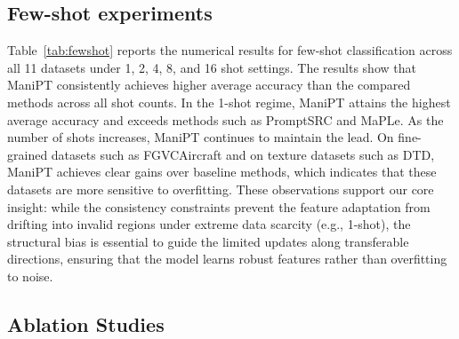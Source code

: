 \documentclass{article}
\theoremstyle{plain}
\theoremstyle{definition}
\theoremstyle{remark}
\begin{document}
	\subsection{Few-shot experiments}
	\label{app:fewshot_results}
	Table~\ref{tab:fewshot} reports the numerical results for few-shot classification across all 11 datasets under 1, 2, 4, 8, and 16 shot settings. The results show that ManiPT consistently achieves higher average accuracy than the compared methods across all shot counts. In the 1-shot regime, ManiPT attains the highest average accuracy and exceeds methods such as PromptSRC and MaPLe. As the number of shots increases, ManiPT continues to maintain the lead. On fine-grained datasets such as FGVCAircraft and on texture datasets such as DTD, ManiPT achieves clear gains over baseline methods, which indicates that these datasets are more sensitive to overfitting. These observations support our core insight: while the consistency constraints prevent the feature adaptation from drifting into invalid regions under extreme data scarcity (e.g., 1-shot), the structural bias is essential to guide the limited updates along transferable directions, ensuring that the model learns robust features rather than overfitting to noise.
	\subsection{Ablation Studies}
	\label{app:ablation_results}
\end{document}
